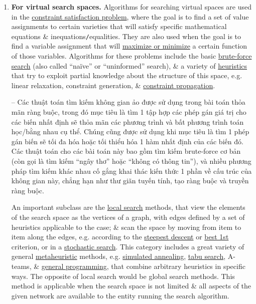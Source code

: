 \documentclass[oneside]{book}
\begin{document}
\begin{enumerate}
	\item {\bf For virtual search spaces.} Algorithms for searching virtual spaces are used in the \href{https://en.wikipedia.org/wiki/Constraint_satisfaction_problem}{constraint satisfaction problem}, where the goal is to find a set of value assignments to certain varieties that will satisfy specific mathematical equations \& inequations{\tt/}equalities. They are also used when the goal is to find a variable assignment that will \href{https://en.wikipedia.org/wiki/Discrete_optimization}{maximize or minimize} a certain function of those variables. Algorithms for these problems include the basic \href{https://en.wikipedia.org/wiki/Brute-force_search}{brute-force search} (also called ``na\"ive'' or ``uninformed'' search), \& a variety of \href{https://en.wikipedia.org/wiki/Heuristic_function}{heuristics} that try to exploit partial knowledge about the structure of this space, e.g. linear relaxation, constraint generation, \& \href{https://en.wikipedia.org/wiki/Local_consistency}{constraint propagation}.
	
	-- Các thuật toán tìm kiếm không gian ảo được sử dụng trong bài toán thỏa mãn ràng buộc, trong đó mục tiêu là tìm 1 tập hợp các phép gán giá trị cho các biến nhất định sẽ thỏa mãn các phương trình và bất phương trình toán học/bằng nhau cụ thể. Chúng cũng được sử dụng khi mục tiêu là tìm 1 phép gán biến sẽ tối đa hóa hoặc tối thiểu hóa 1 hàm nhất định của các biến đó. Các thuật toán cho các bài toán này bao gồm tìm kiếm brute-force cơ bản (còn gọi là tìm kiếm ``ngây thơ'' hoặc ``không có thông tin''), và nhiều phương pháp tìm kiếm khác nhau cố gắng khai thác kiến thức 1 phần về cấu trúc của không gian này, chẳng hạn như thư giãn tuyến tính, tạo ràng buộc và truyền ràng buộc.
	
	An important subclass are the \href{https://en.wikipedia.org/wiki/Local_search_(optimization)}{local search} methods, that view the elements of the search space as the vertices of a graph, with edges defined by a set of heuristics applicable to the case; \& scan the space by moving from item to item along the edges, e.g. according to the \href{https://en.wikipedia.org/wiki/Gradient_descent}{steepest descent} or \href{https://en.wikipedia.org/wiki/Best-first_search}{best 1st} criterion, or in a \href{https://en.wikipedia.org/wiki/Stochastic_optimization}{stochastic search}. This category includes a great variety of general \href{https://en.wikipedia.org/wiki/Metaheuristic}{metaheuristic} methods, e.g. \href{https://en.wikipedia.org/wiki/Simulated_annealing}{simulated annealing}, \href{https://en.wikipedia.org/wiki/Tabu_search}{tabu search}, A-teams, \& \href{https://en.wikipedia.org/wiki/Genetic_programming}{general programming}, that combine arbitrary heuristics in specific ways. The opposite of local search would be global search methods. This method is applicable when the search space is not limited \& all aspects of the given network are available to the entity running the search algorithm.
	

\end{enumerate}
\end{document}
